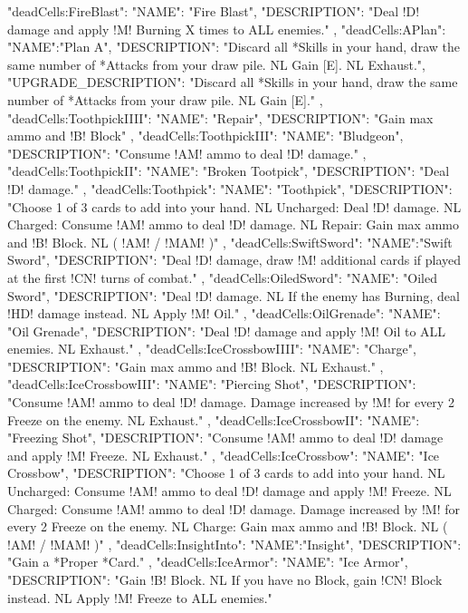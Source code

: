 {  "deadCells:FireBlast": {
    "NAME": "Fire Blast",
    "DESCRIPTION": "Deal !D! damage and apply !M! Burning X times to ALL enemies."
  },
  "deadCells:APlan": {
    "NAME":"Plan A",
    "DESCRIPTION": "Discard all *Skills in your hand, draw the same number of *Attacks from your draw pile. NL Gain [E]. NL Exhaust.",
    "UPGRADE_DESCRIPTION": "Discard all *Skills in your hand, draw the same number of *Attacks from your draw pile. NL Gain [E]."
  },
  "deadCells:ToothpickIIII": {
    "NAME": "Repair",
    "DESCRIPTION": "Gain max ammo and !B! Block"
  },
  "deadCells:ToothpickIII": {
    "NAME": "Bludgeon",
    "DESCRIPTION": "Consume !AM! ammo to deal !D! damage."
  },
  "deadCells:ToothpickII": {
    "NAME": "Broken Tootpick",
    "DESCRIPTION": "Deal !D! damage."
  },
  "deadCells:Toothpick": {
    "NAME": "Toothpick",
    "DESCRIPTION": "Choose 1 of 3 cards to add into your hand. NL Uncharged: Deal !D! damage. NL Charged: Consume !AM! ammo to deal !D! damage. NL Repair: Gain max ammo and !B! Block. NL ( !AM! / !MAM! )"
  },
  "deadCells:SwiftSword": {
    "NAME":"Swift Sword",
    "DESCRIPTION": "Deal !D! damage, draw !M! additional cards if played at the first !CN! turns of combat."
  },
  "deadCells:OiledSword": {
    "NAME": "Oiled Sword",
    "DESCRIPTION": "Deal !D! damage. NL If the enemy has Burning, deal !HD! damage instead. NL Apply !M! Oil."
  },
  "deadCells:OilGrenade": {
    "NAME": "Oil Grenade",
    "DESCRIPTION": "Deal !D! damage and apply !M! Oil to ALL enemies. NL Exhaust."
  },
  "deadCells:IceCrossbowIIII": {
    "NAME": "Charge",
    "DESCRIPTION": "Gain max ammo and !B! Block. NL Exhaust."
  },
  "deadCells:IceCrossbowIII": {
    "NAME": "Piercing Shot",
    "DESCRIPTION": "Consume !AM! ammo to deal !D! damage. Damage increased by !M! for every 2 Freeze on the enemy. NL Exhaust."
  },
  "deadCells:IceCrossbowII":{
    "NAME": "Freezing Shot",
    "DESCRIPTION": "Consume !AM! ammo to deal !D! damage and apply !M! Freeze. NL Exhaust."
  },
  "deadCells:IceCrossbow": {
    "NAME": "Ice Crossbow",
    "DESCRIPTION": "Choose 1 of 3 cards to add into your hand. NL Uncharged: Consume !AM! ammo to deal !D! damage and apply !M! Freeze. NL Charged: Consume !AM! ammo to deal !D! damage. Damage increased by !M! for every 2 Freeze on the enemy. NL Charge: Gain max ammo and !B! Block. NL ( !AM! / !MAM! )"
  },
  "deadCells:InsightInto": {
    "NAME":"Insight",
    "DESCRIPTION": "Gain a *Proper *Card."
  },
  "deadCells:IceArmor": {
    "NAME": "Ice Armor",
    "DESCRIPTION": "Gain !B! Block. NL If you have no Block, gain !CN! Block instead. NL Apply !M! Freeze to ALL enemies."
}}
